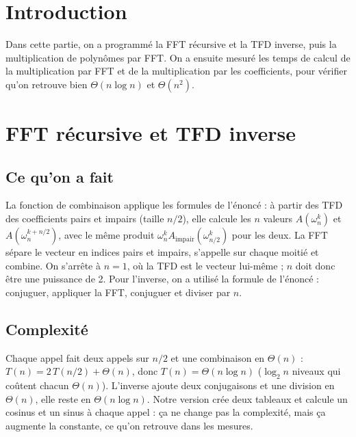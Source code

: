 \documentclass[11pt,a4paper]{article}
\begin{document}
\tableofcontents
\newpage
{}


\section{Introduction}

Dans cette partie, on a programmé la FFT récursive et la TFD inverse, puis la
multiplication de polynômes par FFT. On a ensuite mesuré les temps de calcul de la
multiplication par FFT et de la multiplication par les coefficients, pour vérifier
qu'on retrouve bien $\Theta(n \log n)$ et $\Theta(n^2)$.

\section{FFT récursive et TFD inverse}

\subsection{Ce qu'on a fait}

La fonction de combinaison applique les formules de l'énoncé : à partir des TFD des
coefficients pairs et impairs (taille $n/2$), elle calcule les $n$ valeurs
$A(\omega_n^k)$ et $A(\omega_n^{k+n/2})$, avec le même produit
$\omega_n^k A_{\text{impair}}(\omega_{n/2}^k)$ pour les deux. La FFT sépare le vecteur
en indices pairs et impairs, s'appelle sur chaque moitié et combine. On s'arrête à
$n = 1$, où la TFD est le vecteur lui-même ; $n$ doit donc être une puissance de 2.
Pour l'inverse, on a utilisé la formule de l'énoncé : conjuguer, appliquer la FFT,
conjuguer et diviser par $n$.

\subsection{Complexité}

Chaque appel fait deux appels sur $n/2$ et une combinaison en $\Theta(n)$ :
$T(n) = 2\,T(n/2) + \Theta(n)$, donc $T(n) = \Theta(n \log n)$ ($\log_2 n$ niveaux
qui coûtent chacun $\Theta(n)$). L'inverse ajoute deux conjugaisons et une division
en $\Theta(n)$, elle reste en $\Theta(n \log n)$. Notre version crée deux tableaux et
calcule un cosinus et un sinus à chaque appel : ça ne change pas la complexité, mais
ça augmente la constante, ce qu'on retrouve dans les mesures.
\end{document}
